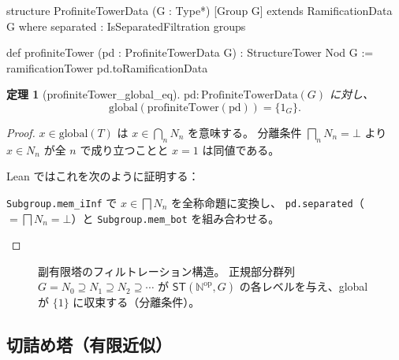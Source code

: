 \documentclass[a4paper,11pt]{ltjsarticle}
\theoremstyle{definition}
\theoremstyle{plain}
\newtheorem{theorem}[definition]{定理}
\theoremstyle{remark}
\newcommand{\ST}{\mathsf{ST}}
\newcommand{\Nod}{\mathbb{N}^{\mathrm{op}}}
\begin{document}
\begin{leancode}[caption={ProfiniteTowerData と profiniteTower の Lean 定義}]
structure ProfiniteTowerData (G : Type*) [Group G] extends
    RamificationData G where
  separated : IsSeparatedFiltration groups

def profiniteTower (pd : ProfiniteTowerData G) : StructureTower Nod G :=
  ramificationTower pd.toRamificationData
\end{leancode}

\begin{theorem}[profiniteTower\_global\_eq]
\label{thm:global}
$\mathrm{pd} : \mathrm{ProfiniteTowerData}(G)$ に対し、
\[
  \mathrm{global}(\mathrm{profiniteTower}(\mathrm{pd})) = \{1_G\}.
\]
\end{theorem}

\begin{proof}
$x \in \mathrm{global}(T)$ は $x \in \bigcap_n N_n$ を意味する。
分離条件 $\bigsqcap_n N_n = \bot$ より $x \in N_n$ が全 $n$ で成り立つことと
$x = 1$ は同値である。

Lean ではこれを次のように証明する：
\begin{proofstrategy}
\texttt{Subgroup.mem\_iInf} で $x \in \bigsqcap N_n$ を全称命題に変換し、
\texttt{pd.separated}（$= \bigsqcap N_n = \bot$）と \texttt{Subgroup.mem\_bot} を組み合わせる。
\end{proofstrategy}
\end{proof}

\begin{figure}[H]
\centering
{}
\caption{副有限塔のフィルトレーション構造。
正規部分群列 $G = N_0 \supseteq N_1 \supseteq N_2 \supseteq \cdots$ が
$\ST(\Nod, G)$ の各レベルを与え、global が $\{1\}$ に収束する（分離条件）。}
\label{fig:profinite}
\end{figure}

\subsection{切詰め塔（有限近似）}
\end{document}
